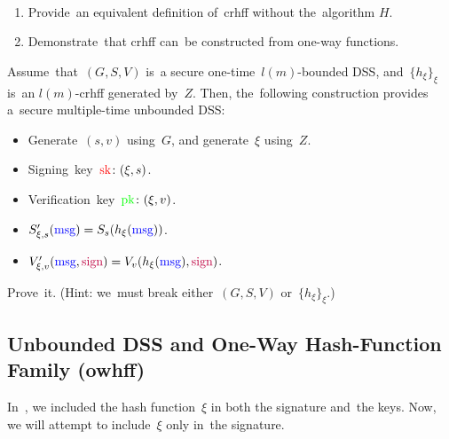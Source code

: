 \begin{exercise} ~
    \begin{enumerate}
        \item Provide~an equivalent definition of~crhff without the~algorithm $H$.
        \item Demonstrate~that crhff can~be constructed from one-way functions.
    \end{enumerate}
\end{exercise}

\begin{theorem} \label{theorem:dss_crhff}
    Assume~that~$(G, S, V)$ is~a secure one-time~$l(m)$-bounded DSS, and~$\{h_{\xi}\}_{\xi}$ is~an $l(m)$-crhff generated by~$Z$.
    Then, the~following construction provides a~secure multiple-time unbounded DSS:

    \begin{itemize}
        \item Generate~$(s, v)$ using~$G$, and generate~$\xi$ using~$Z$.
        \item Signing~key~$\textcolor{red}{\text{sk}} \colon (\xi, s)$.
        \item Verification~key~$\textcolor{green}{\text{pk}} \colon (\xi, v)$.
        \item $S'_{\xi, s}(\textcolor{blue}{\text{msg}}) = S_s(h_\xi(\textcolor{blue}{\text{msg}}))$.
        \item $V'_{\xi, v}(\textcolor{blue}{\text{msg}}, \textcolor{purple}{\text{sign}}) = V_v(h_\xi(\textcolor{blue}{\text{msg}}), \textcolor{purple}{\text{sign}})$.
    \end{itemize}
\end{theorem}

\begin{exercise}
    Prove~it. (Hint: we~must break either~$(G, S, V)$ or~$\{h_\xi\}_\xi$.)
\end{exercise}

\subsection{Unbounded DSS and One-Way Hash-Function Family (owhff)}


In~, we included the hash function~$\xi$ in both the signature and~the keys. 
Now, we will attempt to include~$\xi$ only in~the signature.

